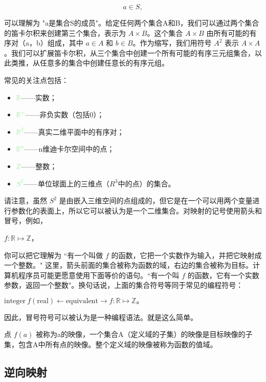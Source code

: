 \documentclass[lang=cn,12pt]{elegantbook}
\begin{document}
$$a \in S,$$ 

可以理解为 "a是集合S的成员"。给定任何两个集合A和B，我们可以通过两个集合的笛卡尔积来创建第三个集合，表示为 $A \times B$。这个集合 $A \times B$ 由所有可能的有序对（a，b）组成，其中 $a \in A$ 和 $b \in B$。作为缩写，我们用符号 $A^2$ 表示 $A \times A$。我们可以扩展笛卡尔积，从三个集合中创建一个所有可能的有序三元组集合，以此类推，从任意多的集合中创建任意长的有序元组。

常见的关注点包括：

\begin{itemize}
  \item \textcolor{lightgreen}{$\mathbb{R}$}——实数；
  \item \textcolor{lightgreen}{$\mathbb{R^+}$}——非负实数（包括0）；
  \item \textcolor{lightgreen}{$\mathbb{R}^2$}——真实二维平面中的有序对；
  \item \textcolor{lightgreen}{$\mathbb{R}^n$}——n维迪卡尔空间中的点；
  \item \textcolor{lightgreen}{$\mathbb{Z}$}——整数；
  \item \textcolor{lightgreen}{$S^2$}——单位球面上的三维点（$R^3$中的点）的集合。
\end{itemize}

请注意，虽然 $S^2$ 是由嵌入三维空间的点组成的，但它是在一个可以用两个变量进行参数化的表面上，所以它可以被认为是一个二维集合。对映射的记号使用箭头和冒号，例如，
\begin{center}
  $f : \mathbb{R} \mapsto \mathbb{Z}$，
\end{center}

你可以把它理解为 ``有一个叫做 $f$ 的函数，它把一个实数作为输入，并把它映射成一个整数。" 这里，箭头前面的集合被称为函数的域，右边的集合被称为目标。计算机程序员可能更愿意使用下面等价的语句。``有一个叫 $f$ 的函数，它有一个实数参数，返回一个整数"。换句话说，上面的集合符号等同于常见的编程符号：

\begin{center}
  $\text{integer} \  f(\text{real}) \leftarrow \text{equivalent} \rightarrow f : \mathbb{R} \mapsto \mathbb{Z}。$
\end{center}

因此，冒号符号可以被认为是一种编程语法。就是这么简单。

点 $f(a)$ 被称为a的映像，一个集合A（定义域的子集）的映像是目标映像的子集，包含A中所有点的映像。整个定义域的映像被称为函数的值域。

\subsection{逆向映射}
\end{document}
